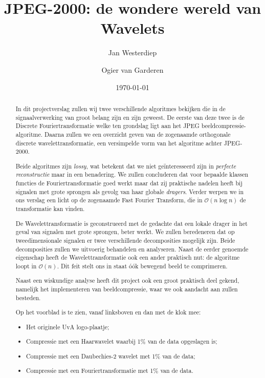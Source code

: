 \documentclass[11pt]{uvamath}
\title{JPEG-2000: de wondere wereld van Wavelets}
\date{\today}
\author[10219242, janner@gmail.com]{Jan Westerdiep}
\author[10191429, ovangarderen@gmail.com]{Ogier van Garderen}
\theoremstyle{plain}
\theoremstyle{definition}
\theoremstyle{remark}
\begin{document}
\maketitle

\begin{abstract}
In dit projectverslag zullen wij twee verschillende algoritmes bekijken die in de signaalverwerking van groot belang zijn en zijn geweest. De eerste van deze twee is de Discrete Fouriertransformatie welke ten grondslag ligt aan het JPEG beeldcompressie-algoritme. Daarna zullen we een overzicht geven van de zogenaamde orthogonale discrete wavelettransformatie, een versimpelde vorm van het algoritme achter JPEG-2000.

Beide algoritmes zijn \emph{lossy}, wat betekent dat we niet ge\"interesseerd zijn in \emph{perfecte reconstructie} maar in een benadering. We zullen concluderen dat voor bepaalde klassen functies de Fouriertransformatie goed werkt maar dat zij praktische nadelen heeft bij signalen met grote sprongen als gevolg van haar globale \emph{dragers}. Verder werpen we in ons verslag een licht op de zogenaamde Fast Fourier Transform, die in $\mathcal{O}(n \log n)$ de transformatie kan vinden.

De Wavelettransformatie is geconstrueerd met de gedachte dat een lokale drager in het geval van signalen met grote sprongen, beter werkt. We zullen beredeneren dat op tweedimensionale signalen er twee verschillende decomposities mogelijk zijn. Beide decomposities zullen we uitvoerig behandelen en analyseren. Naast de eerder genoemde eigenschap heeft de Wavelettransformatie ook een ander praktisch nut: de algoritme loopt in $\mathcal{O}(n)$. Dit  feit stelt ons in staat \'o\'ok bewegend beeld te comprimeren. 

Naast een wiskundige analyse heeft dit project ook een groot praktisch deel gekend, namelijk het implementeren
van beeldcompressie, waar we ook aandacht aan zullen besteden.

Op het voorblad is te zien, vanaf linksboven en dan met de klok mee:
\begin{itemize}
	\item Het originele UvA logo-plaatje;
	\item Compressie met een Haarwavelet waarbij 1\% van de data opgeslagen is;
	\item Compressie met een Daubechies-2 wavelet met 1\% van de data;
	\item Compressie met een Fouriertransformatie met 1\% van de data.
\end{itemize}
\end{abstract}
\end{document}
